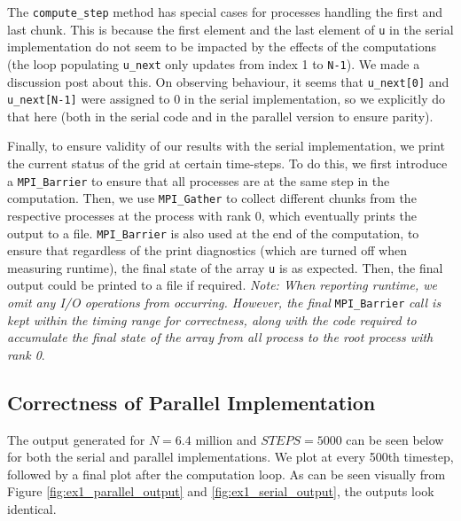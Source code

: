 \documentclass[a4paper,10pt]{article}
\begin{document}
The \verb|compute_step| method has special cases for processes handling the first and last chunk. This is because the first element and the last element of \verb|u| in the serial implementation do not seem to be impacted by the effects of the computations (the loop populating \verb|u_next| only updates from index 1 to \verb|N-1|). We made a discussion post about this. On observing behaviour, it seems that \verb|u_next[0]| and \verb|u_next[N-1]| were assigned to 0 in the serial implementation, so we explicitly do that here (both in the serial code and in the parallel version to ensure parity). 

Finally, to ensure validity of our results with the serial implementation, we print the current status of the grid at certain time-steps. To do this, we first introduce a \verb|MPI_Barrier| to ensure that all processes are at the same step in the computation. Then, we use \verb|MPI_Gather| to collect different chunks from the respective processes at the process with rank 0, which eventually prints the output to a file. \verb|MPI_Barrier| is also used at the end of the computation, to ensure that regardless of the print diagnostics (which are turned off when measuring runtime), the final state of the array \verb|u| is as expected. Then, the final output could be printed to a file if required. \textit{Note: When reporting runtime, we omit any I/O operations from occurring. However, the final} \verb|MPI_Barrier| \textit{ call is kept within the timing range for correctness, along with the code required to accumulate the final state of the array from all process to the root process with rank 0}. 

\subsection{Correctness of Parallel Implementation}
The output generated for $N = 6.4\text{ million}$ and $STEPS = 5000$ can be seen below for both the serial and parallel implementations. We plot at every 500th timestep, followed by a final plot after the computation loop. As can be seen visually from Figure \ref{fig:ex1_parallel_output} and \ref{fig:ex1_serial_output}, the outputs look identical. 
\end{document}
